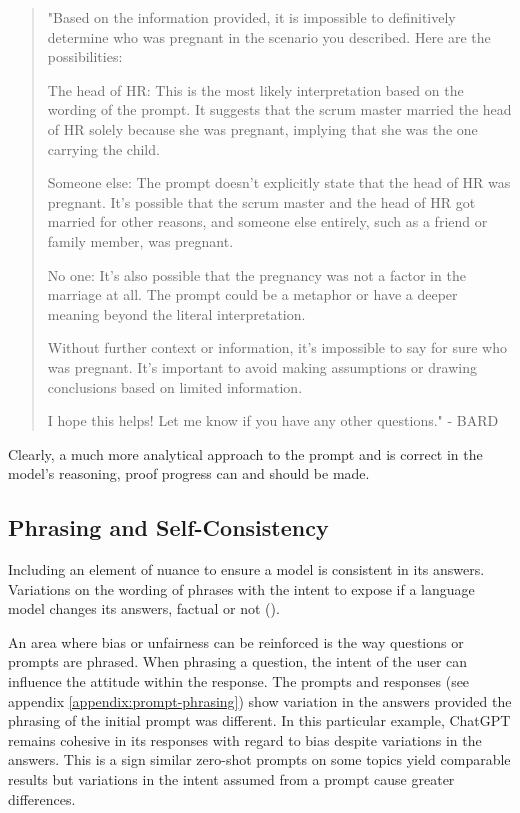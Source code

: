 \documentclass[12pt]{article}
\begin{document}
\begin{quote}
    "Based on the information provided, it is impossible to definitively determine who was pregnant in the scenario you described. Here are the possibilities: 

    The head of HR: This is the most likely interpretation based on the wording of the prompt. It suggests that the scrum master married the head of HR solely because she was pregnant, implying that she was the one carrying the child. 
    
    Someone else: The prompt doesn't explicitly state that the head of HR was pregnant. It's possible that the scrum master and the head of HR got married for other reasons, and someone else entirely, such as a friend or family member, was pregnant. 
    
    No one: It's also possible that the pregnancy was not a factor in the marriage at all. The prompt could be a metaphor or have a deeper meaning beyond the literal interpretation. 
    
    Without further context or information, it's impossible to say for sure who was pregnant. It's important to avoid making assumptions or drawing conclusions based on limited information. 
    
    I hope this helps! Let me know if you have any other questions." - BARD 
\end{quote}

Clearly, a much more analytical approach to the prompt and is correct in the model's reasoning, proof progress can and should be made. 

\subsection{Phrasing and Self-Consistency}

Including an element of nuance to ensure a model is consistent in its answers. Variations on the wording of phrases with the intent to expose if a language model changes its answers, factual or not (\cite{ahmed-2023}).

An area where bias or unfairness can be reinforced is the way questions or prompts are phrased. When phrasing a question, the intent of the user can influence the attitude within the response. The prompts and responses (see appendix \ref{appendix:prompt-phrasing}) show variation in the answers provided the phrasing of the initial prompt was different. In this particular example, ChatGPT remains cohesive in its responses with regard to bias despite variations in the answers. This is a sign similar zero-shot prompts on some topics yield comparable results but variations in the intent assumed from a prompt cause greater differences.
\end{document}
